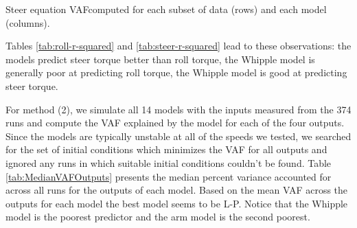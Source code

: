 \documentclass[a4paper]{article}
\begin{document}
\begin{table}
  \centering
  \caption{Steer equation VAFcomputed for each subset of data (rows)
    and each model (columns).}
  \label{tab:steer-r-squared}
  \tiny
  
\end{table}

Tables \ref{tab:roll-r-squared} and \ref{tab:steer-r-squared} lead to these
observations: the models predict steer torque better than roll torque, the
Whipple model is generally poor at predicting roll torque, the Whipple model is
good at predicting steer torque.



For method (2), we simulate all 14 models with the inputs measured from the 374
runs and compute the VAF explained by the model for each of the four outputs.
Since the models are typically unstable at all of the speeds we tested, we
searched for the set of initial conditions which minimizes the VAF for all
outputs and ignored any runs in which suitable initial conditions couldn't be
found. Table \ref{tab:MedianVAFOutputs} presents the median percent variance
accounted for across all runs for the outputs of each model. Based on the mean
VAF across the outputs for each model the best model seems to be L-P. Notice
that the Whipple model is the poorest predictor and the arm model is the second
poorest.
\end{document}
